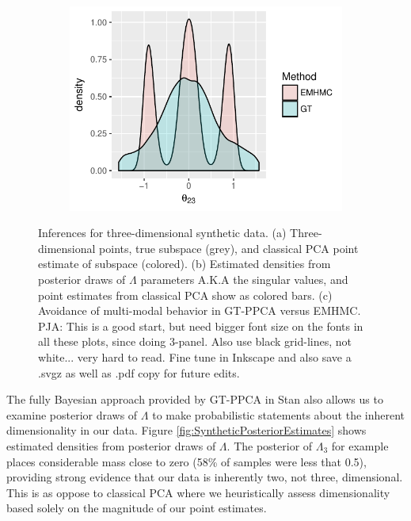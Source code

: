 \documentclass{article}
\newcommand{\commentPJA}[1]{{\textcolor{commentPJA_color}{PJA: #1}}}
\begin{document}
\begin{figure}
    ~ %
    \begin{subfigure}[b]{0.3\textwidth}
        \includegraphics[width=\textwidth]{multiModal.pdf}
        \caption{}
        \label{fig:multiModal}
    \end{subfigure}
    \caption{Inferences for three-dimensional synthetic data. (a) Three-dimensional points, true subspace (grey), and classical PCA point estimate of subspace (colored). (b) Estimated densities from posterior draws of $\Lambda$ parameters A.K.A  the singular values, and point estimates from classical PCA show as colored bars. (c) Avoidance of multi-modal behavior in GT-PPCA versus EMHMC. \commentPJA{This is a good start, but need bigger font size on the fonts in all these plots, since doing 3-panel.  Also use black grid-lines, not white... very hard to read.  Fine tune in Inkscape and also save a .svgz as well as .pdf copy for future edits.}}\label{fig:synthetic}
\end{figure}

The fully Bayesian approach provided by GT-PPCA in Stan also allows us to examine posterior draws of $\Lambda$ to make probabilistic statements about the inherent dimensionality in our data. Figure \ref{fig:SyntheticPosteriorEstimates} shows estimated densities from posterior draws of $\Lambda$. The posterior of $\Lambda_3$ for example places considerable mass close to zero (58\% of samples were less that 0.5), providing strong evidence that our data is inherently two, not three, dimensional. This is as oppose to classical PCA where we heuristically assess dimensionality based solely on the magnitude of our point estimates.
\end{document}
